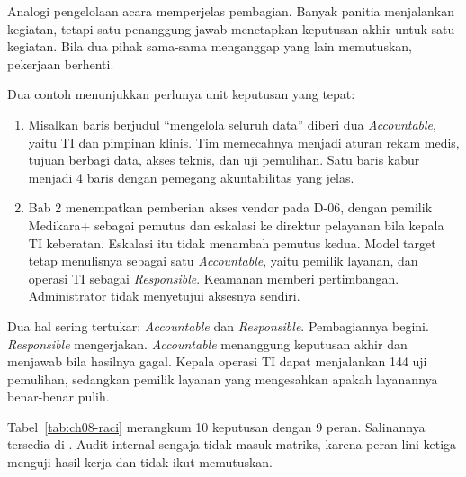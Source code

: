 Analogi pengelolaan acara memperjelas pembagian. Banyak panitia menjalankan kegiatan, tetapi satu
penanggung jawab menetapkan keputusan akhir untuk satu kegiatan. Bila dua pihak sama-sama
menganggap yang lain memutuskan, pekerjaan berhenti.

Dua contoh menunjukkan perlunya unit keputusan yang tepat:
\begin{enumerate}
  \item Misalkan baris berjudul ``mengelola seluruh data'' diberi dua \textit{Accountable}, yaitu
  TI dan pimpinan klinis. Tim memecahnya menjadi aturan rekam medis, tujuan berbagi data, akses
  teknis, dan uji pemulihan. Satu baris kabur menjadi 4 baris dengan pemegang akuntabilitas yang
  jelas.
  \item Bab 2 menempatkan pemberian akses vendor pada D-06, dengan pemilik Medikara+ sebagai
  pemutus dan eskalasi ke direktur pelayanan bila kepala TI keberatan. Eskalasi itu tidak menambah
  pemutus kedua. Model target tetap menulisnya sebagai satu \textit{Accountable}, yaitu pemilik
  layanan, dan operasi TI sebagai \textit{Responsible}. Keamanan memberi pertimbangan. Administrator
  tidak menyetujui aksesnya sendiri.
\end{enumerate}

Dua hal sering tertukar: \textit{Accountable} dan \textit{Responsible}. Pembagiannya begini.
\textit{Responsible} mengerjakan. \textit{Accountable} menanggung keputusan akhir dan menjawab
bila hasilnya gagal. Kepala operasi TI dapat menjalankan 144 uji pemulihan, sedangkan pemilik
layanan yang mengesahkan apakah layanannya benar-benar pulih.

Tabel~\ref{tab:ch08-raci} merangkum 10 keputusan dengan 9 peran. Salinannya tersedia di
. Audit internal sengaja tidak masuk matriks,
karena peran lini ketiga menguji hasil kerja dan tidak ikut memutuskan.

